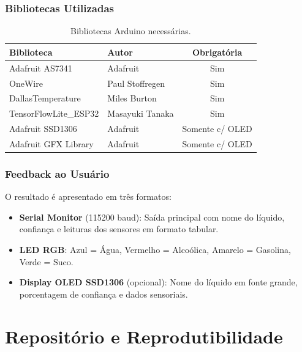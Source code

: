 \documentclass[12pt, a4paper]{article}
\begin{document}
\subsubsection{Bibliotecas Utilizadas}

\begin{table}[H]
  \centering
  \caption{Bibliotecas Arduino necess\'{a}rias.}
  \begin{tabular}{llc}
    \toprule
    \textbf{Biblioteca} & \textbf{Autor} & \textbf{Obrigat\'{o}ria} \\
    \midrule
    Adafruit AS7341       & Adafruit           & Sim \\
    OneWire               & Paul Stoffregen    & Sim \\
    DallasTemperature     & Miles Burton       & Sim \\
    TensorFlowLite\_ESP32 & Masayuki Tanaka    & Sim \\
    Adafruit SSD1306      & Adafruit           & Somente c/ OLED \\
    Adafruit GFX Library  & Adafruit           & Somente c/ OLED \\
    \bottomrule
  \end{tabular}
\end{table}

\subsubsection{Feedback ao Usu\'{a}rio}

O resultado \'{e} apresentado em tr\^{e}s formatos:

\begin{itemize}
  \item \textbf{Serial Monitor} (115200 baud): Sa\'{i}da principal com nome do l\'{i}quido, confian\c{c}a e leituras dos sensores em formato tabular.
  \item \textbf{LED RGB}: Azul = \'{A}gua, Vermelho = Alco\'{o}lica, Amarelo = Gasolina, Verde = Suco.
  \item \textbf{Display OLED SSD1306} (opcional): Nome do l\'{i}quido em fonte grande, porcentagem de confian\c{c}a e dados sensoriais.
\end{itemize}

\section{Reposit\'{o}rio e Reprodutibilidade}
\end{document}
